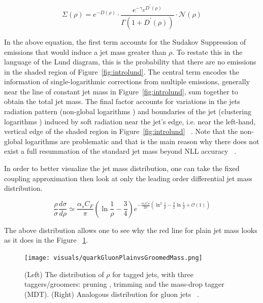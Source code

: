\begin{equation}
\Sigma(\rho)=e^{-D(\rho)} \cdot \frac{e^{-\gamma_{E} D^{\prime}(\rho)}}{\Gamma\left(1+D^{\prime}(\rho)\right)} \cdot \mathcal{N}(\rho)
\end{equation}

In the above equation, the first term accounts for the Sudakov Suppression of emissions that would induce a jet mass greater than $\rho$. To restate this in the language of the Lund diagram, this is the probability that there are no emissions in the shaded region of Figure~\ref{fig:introlund}. The central term encodes the information of single-logarithmic corrections from multiple emissions, generally near the line of constant jet mass in Figure~\ref{fig:introlund}, sum together to obtain the total jet mass. The final factor accounts for variations in the jets radiation pattern (non-global logarithms ) and boundaries of the jet (clustering logarithms ) induced by soft radiation near the jet’s edge, i.e. near the left-hand, vertical edge of the shaded region in Figure~\ref{fig:introlund} ~\cite{mmdt}. Note that the non-global logarithms are problematic and that is the main reason why there does not exist a full resummation of the standard jet mass beyond NLL accuracy ~\cite{mmdt}.


In order to better visualize the jet mass distribution, one can take the fixed coupling approximation then look at only the leading order differential jet mass distribution.~\cite{mmdt}

\begin{equation}
\frac{\rho}{\sigma} \frac{d \sigma}{d \rho} \simeq \frac{\alpha_{s} C_{F}}{\pi}\left(\ln \frac{1}{\rho}-\frac{3}{4}\right) e^{-\frac{\alpha_{s} C_{F}}{2 \pi}\left(\ln ^{2} \frac{1}{\rho}-\frac{3}{2} \ln \frac{1}{\rho}+\mathcal{O}(1)\right)}
\end{equation}

The above distribution allows one to see why the red line for plain jet mass looks as it does in the Figure ~\ref{fig:quarkGluonPlainvsGroomedMass}.

\begin{figure}[htb]
\centering
\texttt{[image: visuals/quarkGluonPlainvsGroomedMass.png]}
\caption{(Left) The distribution of $\rho$ for tagged jets, with three taggers/groomers: pruning , trimming and the mass-drop tagger (MDT). (Right) Analogous distribution for gluon jets ~\cite{mmdt}.}
\label{fig:quarkGluonPlainvsGroomedMass}
\end{figure}



